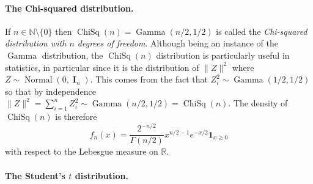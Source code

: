 \documentclass[
	fontsize=11pt, %
	twoside=false, %
	numbers=noenddot, %
]{kaobook}
\DeclareMathOperator{\bI}{{\boldsymbol I}}
\DeclareMathOperator{\chisq}{ChiSq}
\DeclareMathOperator{\gam}{Gamma}
\DeclareMathOperator{\nor}{Normal}
\newcommand{\R}{\mathbb R}
\newcommand{\N}{\mathbb N}
\newcommand{\ind}[1]{\mathbf 1_{#1}}
\newcommand{\norm}[1]{\| #1 \|}
\begin{document}
\paragraph{The Chi-squared distribution.} %

If $n \in \N \setminus \{ 0 \}$ then $\chisq(n) = \gam(n/2, 1/2)$ is called the \emph{Chi-squared distribution with $n$ degrees of freedom}.
Although being an instance of the $\gam$ distribution, the $\chisq(n)$ distribution is particularly useful  in statistics, in particular since it is the distribution of $\norm{Z}^2$ where $Z \sim \nor(0, \bI_n)$. 
This comes from the fact that $Z_i^2 \sim \gam(1/2, 1/2)$ so that by independence $\norm{Z}^2 = \sum_{i=1}^n Z_i^2 \sim \gam(n/2, 1/2) = \chisq(n)$.
The density of $\chisq(n)$ is therefore 
\begin{equation*}
	f_n(x) = \frac{2^{-n / 2}}{\Gamma(n/2)} x^{n / 2 - 1} e^{-x / 2} \ind{x \geq 0}
\end{equation*}
with respect to the Lebesgue measure on $\R$.

\paragraph{The Student's $t$ distribution.} %
\end{document}
